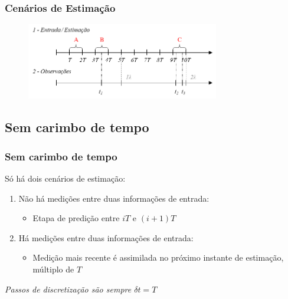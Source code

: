 \documentclass{beamer}
\begin{document}

\begin{frame}
	\frametitle{Cenários de Estimação}
	
	\begin{figure}
		\centering
		\includegraphics[width=0.75\textwidth]{images/cenarios-est.png}
	\end{figure}
	

\end{frame}


\subsection{Sem carimbo de tempo} 

\begin{frame}
	\frametitle{Sem carimbo de tempo}
	
	Só há dois cenários de estimação:
	\vspace{0.25cm}
	
	\begin{enumerate}
		\item Não há medições entre duas informações de entrada:
		\begin{itemize}
			\item Etapa de predição entre $iT$ e $(i+1)T$
		\end{itemize}
		\vspace{0.25cm}
		\item Há medições entre duas informações de entrada:
		\begin{itemize}
			\item Medição mais recente é assimilada no próximo instante de estimação, múltiplo de $T$
		\end{itemize}
	\end{enumerate}
	
	\textit{Passos de discretização são sempre $\delta t = T$}

\end{frame}
\end{document}
